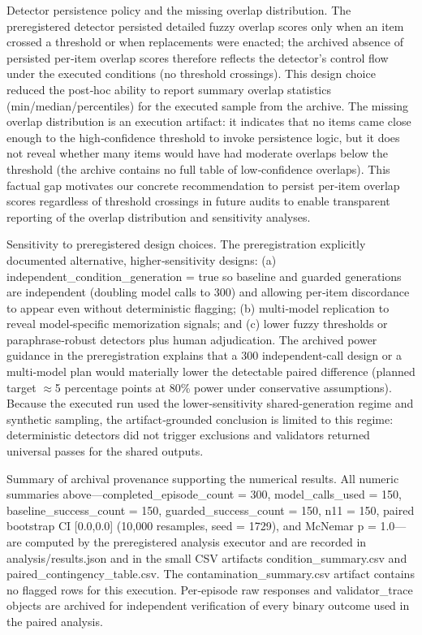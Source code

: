 \documentclass[conference]{IEEEtran}
\begin{document}
Detector persistence policy and the missing overlap distribution. The preregistered detector persisted detailed fuzzy overlap scores only when an item crossed a threshold or when replacements were enacted; the archived absence of persisted per‑item overlap scores therefore reflects the detector's control flow under the executed conditions (no threshold crossings). This design choice reduced the post‑hoc ability to report summary overlap statistics (min/median/percentiles) for the executed sample from the archive. The missing overlap distribution is an execution artifact: it indicates that no items came close enough to the high‑confidence threshold to invoke persistence logic, but it does not reveal whether many items would have had moderate overlaps below the threshold (the archive contains no full table of low‑confidence overlaps). This factual gap motivates our concrete recommendation to persist per‑item overlap scores regardless of threshold crossings in future audits to enable transparent reporting of the overlap distribution and sensitivity analyses.

Sensitivity to preregistered design choices. The preregistration explicitly documented alternative, higher‑sensitivity designs: (a) independent\_condition\_generation = true so baseline and guarded generations are independent (doubling model calls to 300) and allowing per‑item discordance to appear even without deterministic flagging; (b) multi‑model replication to reveal model‑specific memorization signals; and (c) lower fuzzy thresholds or paraphrase‑robust detectors plus human adjudication. The archived power guidance in the preregistration explains that a 300 independent‑call design or a multi‑model plan would materially lower the detectable paired difference (planned target \ensuremath{\approx}5 percentage points at 80\% power under conservative assumptions). Because the executed run used the lower‑sensitivity shared‑generation regime and synthetic sampling, the artifact‑grounded conclusion is limited to this regime: deterministic detectors did not trigger exclusions and validators returned universal passes for the shared outputs.

Summary of archival provenance supporting the numerical results. All numeric summaries above---completed\_episode\_count = 300, model\_calls\_used = 150, baseline\_success\_count = 150, guarded\_success\_count = 150, n11 = 150, paired bootstrap CI [0.0,0.0] (10,000 resamples, seed = 1729), and McNemar p = 1.0---are computed by the preregistered analysis executor and are recorded in analysis/results.json and in the small CSV artifacts condition\_summary.csv and paired\_contingency\_table.csv. The contamination\_summary.csv artifact contains no flagged rows for this execution. Per‑episode raw responses and validator\_trace objects are archived for independent verification of every binary outcome used in the paired analysis.
\end{document}
